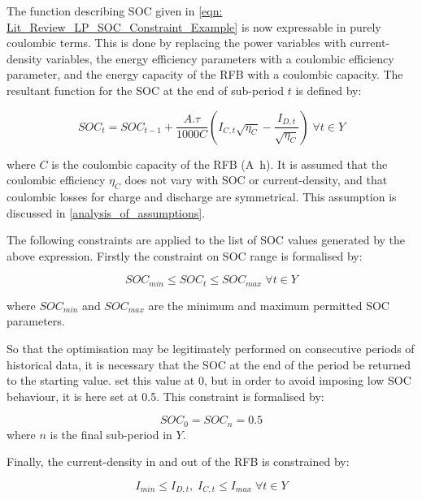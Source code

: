 \documentclass[preprint,3p,review,authoryear,10pt]{elsarticle}
\begin{document}
The function describing SOC given in \cref{eqn: Lit_Review_LP_SOC_Constraint_Example} is now expressable in purely coulombic terms. This is done by replacing the power variables with current-density variables, the energy efficiency parameters with a coulombic efficiency parameter, and the energy capacity of the RFB with a coulombic capacity. The resultant function for the SOC at the end of sub-period $t$ is defined by:

\begin{equation}
\label{eqn: Method_SOC_Tracker}
SOC_t = SOC_{t-1} + \frac{A.\tau}{1000C}(I_{C,t}\sqrt{\eta_C} - \frac{I_{D,t}}{\sqrt{\eta_C}}) \; \forall t \in Y
\end{equation}

where $C$ is the coulombic capacity of the RFB (\si{\ampere\hour}). It is assumed that the coulombic efficiency $\eta_C$ does not vary with SOC or current-density, and that coulombic losses for charge and discharge are symmetrical. This assumption is discussed in \cref{analysis_of_assumptions}. 

The following constraints are applied to the list of SOC values generated by the above expression. Firstly the constraint on SOC range is formalised by:

\begin{equation}
\label{eqn: Method_Constraint_SOC_Range}
SOC_{min} \leq SOC_t \leq SOC_{max} \; \forall t \in Y
\end{equation}

where $SOC_{min}$ and $SOC_{max}$ are the minimum and maximum permitted SOC parameters.

So that the optimisation may be legitimately performed on consecutive periods of historical data, it is necessary that the SOC at the end of the period be returned to the starting value. \cite{Hu2010} set this value at 0, but in order to avoid imposing low SOC behaviour, it is here set at 0.5. This constraint is formalised by:

\begin{equation}
\label{eqn: Method_Constraint_E_Conservation}
SOC_0 = SOC_n = 0.5
\end{equation}
where $n$ is the final sub-period in $Y$.

Finally, the current-density in and out of the RFB is constrained by:

\begin{equation}
\label{eqn: Method_Constraint_Ia}
I_{min} \leq I_{D,t}, \; I_{C,t} \leq I_{max} \; \forall t \in Y
\end{equation}
\end{document}
